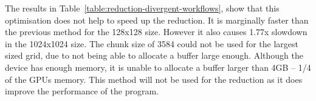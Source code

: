 The results in Table~\ref{table:reduction-divergent-workflows}, show that this optimisation does not help to speed up the reduction. It is marginally faster than the previous method for the 128x128 size. However it also causes 1.77x slowdown in the 1024x1024 size. The chunk size of 3584 could not be used for the largest sized grid, due to not being able to allocate a buffer large enough. Although the device has enough memory, it is unable to allocate a buffer larger than 4GB -- 1/4 of the GPUs memory. This method will not be used for the reduction as it does improve the performance of the program.